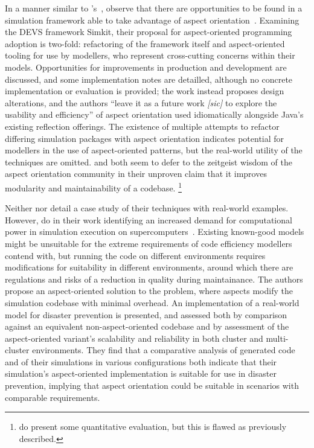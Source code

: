 In a manner similar to
\citeauthor{chibani2019using}'s~\cite{chibani2019using,chibani2013toward,chibani2014practical},
\citeauthor{DEVSaspectorientation2008aksu} observe that there are opportunities
to be found in a simulation framework able to take advantage of aspect
orientation~\cite{DEVSaspectorientation2008aksu}. Examining the DEVS framework
Simkit, their proposal for aspect-oriented programming adoption is two-fold:
refactoring of the framework itself and aspect-oriented tooling for use by
modellers, who represent cross-cutting concerns within their models.
Opportunities for improvements in production and development are discussed, and
some implementation notes are detailled, although no concrete implementation or
evaluation is provided; the work instead proposes design alterations, and the
authors ``leave it as a future work \emph{[sic]} to explore the usability and
efficiency'' of aspect orientation used idiomatically alongside Java's existing
reflection offerings. The existence of multiple attempts to refactor differing
simulation packages with aspect orientation indicates potential for modellers in
the use of aspect-oriented patterns, but the real-world utility of the
techniques are omitted. \citeauthor{chibani2019using} and
\citeauthor{DEVSaspectorientation2008aksu} both seem to defer to the zeitgeist
wisdom of the aspect orientation community in their unproven claim that it
improves modularity and maintainability of a codebase.
\footnote{\citeauthor{chibani2014practical} do present some quantitative
evaluation, but this is flawed as previously described.}

Neither \citeauthor{gulyas1999use} nor
\citeauthor{DEVSaspectorientation2008aksu} detail a case study of their
techniques with real-world examples. However, \citeauthor{ionescu2009aspect} do
in their work identifying an increased demand for computational power in
simulation execution on supercomputers~\cite{ionescu2009aspect}. Existing
known-good models might be unsuitable for the extreme requirements of code
efficiency modellers contend with, but running the code on different
environments requires modifications for suitability in different environments,
around which there are regulations and risks of a reduction in quality during
maintainance. The authors propose an aspect-oriented solution to the problem,
where aspects modify the simulation codebase with minimal overhead. An
implementation of a real-world model for disaster prevention is presented, and
assessed both by comparison against an equivalent non-aspect-oriented codebase
and by assessment of the aspect-oriented variant's scalability and reliability
in both cluster and multi-cluster environments. They find that a comparative
analysis of generated code and of their simulations in various configurations
both indicate that their simulation's aspect-oriented implementation is suitable
for use in disaster prevention, implying that aspect orientation could be
suitable in scenarios with comparable requirements.

